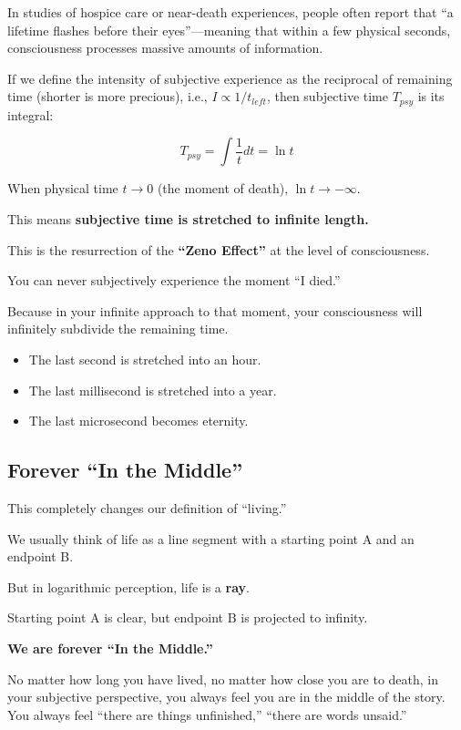 In studies of hospice care or near-death experiences, people often report that ``a lifetime flashes before their eyes''---meaning that within a few physical seconds, consciousness processes massive amounts of information.

If we define the intensity of subjective experience as the reciprocal of remaining time (shorter is more precious), i.e., $I \propto 1/t_{left}$, then subjective time $T_{psy}$ is its integral:

\[T_{psy} = \int \frac{1}{t} dt = \ln t\]

When physical time $t \to 0$ (the moment of death), $\ln t \to -\infty$.

This means \textbf{subjective time is stretched to infinite length.}

This is the resurrection of the \textbf{``Zeno Effect''} at the level of consciousness.

You can never subjectively experience the moment ``I died.''

Because in your infinite approach to that moment, your consciousness will infinitely subdivide the remaining time.

\begin{itemize}
\item The last second is stretched into an hour.

\item The last millisecond is stretched into a year.

\item The last microsecond becomes eternity.
\end{itemize}

\subsection{Forever ``In the Middle''}

This completely changes our definition of ``living.''

We usually think of life as a line segment with a starting point A and an endpoint B.

But in logarithmic perception, life is a \textbf{ray}.

Starting point A is clear, but endpoint B is projected to infinity.

\textbf{We are forever ``In the Middle.''}

No matter how long you have lived, no matter how close you are to death, in your subjective perspective, you always feel you are in the middle of the story. You always feel ``there are things unfinished,'' ``there are words unsaid.''

